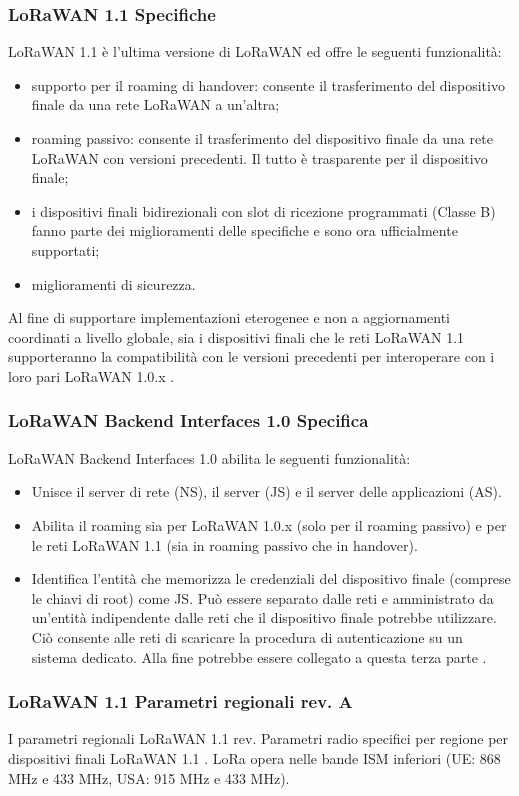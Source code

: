 \documentclass[a4paper]{report} %
\begin{document}
\subsubsection{LoRaWAN 1.1 Specifiche}
LoRaWAN 1.1 è l'ultima versione di LoRaWAN ed offre le seguenti funzionalità:
\begin{itemize}
\item supporto per il roaming di handover: consente il trasferimento del dispositivo finale da una rete LoRaWAN a un'altra; 
\item roaming passivo: consente il trasferimento del dispositivo finale da una rete LoRaWAN con versioni precedenti. Il tutto è trasparente per il dispositivo finale;
\item i dispositivi finali bidirezionali con slot di ricezione programmati (Classe B) fanno parte dei miglioramenti delle specifiche e sono ora ufficialmente supportati;
\item miglioramenti di sicurezza.
\end{itemize}
Al fine di supportare implementazioni eterogenee e non a aggiornamenti coordinati a livello globale, sia i dispositivi finali che le reti LoRaWAN 1.1 supporteranno la compatibilità con le versioni precedenti per interoperare con i loro pari LoRaWAN 1.0.x \cite{art:rif.29}.

\subsubsection{LoRaWAN Backend Interfaces 1.0 Specifica}
LoRaWAN Backend Interfaces 1.0 abilita le seguenti funzionalità:
\begin{itemize}
\item Unisce il server di rete (NS), il server (JS) e il server delle applicazioni (AS).
\item Abilita il roaming sia per LoRaWAN 1.0.x (solo per il roaming passivo) e per le reti LoRaWAN 1.1 (sia in roaming passivo che in handover).
\item Identifica l'entità che memorizza le credenziali del dispositivo finale (comprese le chiavi di root) come JS. Può essere separato dalle reti e amministrato da un'entità indipendente dalle reti che il dispositivo finale potrebbe utilizzare. Ciò consente alle reti di scaricare la procedura di autenticazione su un sistema dedicato. Alla fine potrebbe essere collegato a questa terza parte \cite{art:rif.29}.
\end{itemize}

\subsubsection{LoRaWAN 1.1 Parametri regionali rev. A}
I parametri regionali LoRaWAN 1.1 rev. Parametri radio specifici per regione per dispositivi finali LoRaWAN 1.1 \cite{art:rif.29}.
LoRa opera nelle bande ISM inferiori (UE: 868 MHz e 433 MHz, USA: 915 MHz e 433 MHz). 
\end{document}
